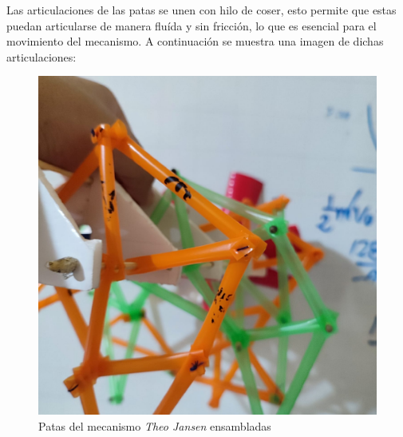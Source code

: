 \begin{multicols}{2}
Las articulaciones de las patas se unen con hilo de coser, esto permite que estas puedan articularse de manera fluída y sin fricción, lo que es esencial para el movimiento del mecanismo. A continuación se muestra una imagen de dichas articulaciones:
\begin{figure}[H]
  \centering
  \includegraphics[width=0.6\linewidth]{./assets/articulacion.jpeg}
  \caption{Patas del mecanismo \textit{Theo Jansen
} ensambladas}
  \label{fig:patas_ensambladas}
\end{figure}


\end{multicols}
